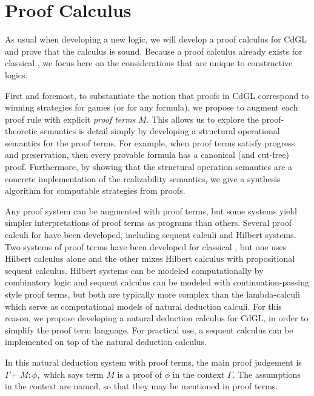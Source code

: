 \documentclass[12pt]{cmuthesis}
\theoremstyle{definition}
\theoremstyle{remark}
\newcommand{\CdGL}{\textsf{CdGL}\xspace}
\begin{document}
\section{Proof Calculus}
\newcommand{\proves}[3]{#1 \vdash #2\mathop{:}#3}
As usual when developing a new logic, we will develop a proof calculus for \CdGL and prove that the calculus is sound.
Because a proof calculus already exists for classical \dGL, we focus here on the considerations that are unique to constructive logics.

First and foremost, to substantiate the notion that proofs in \CdGL correspond to winning strategies for games (or for any formula), we propose to augment each proof rule with explicit \emph{proof terms} $M$.
This allows us to explore the proof-theoretic semantics is detail simply by developing a structural operational semantics for the proof terms.
For example, when proof terms satisfy progress and preservation, then every provable formula has a canonical (and cut-free) proof.
Furthermore, by showing that the structural operation semantics are a concrete implementation of the realizability semantics, we give a synthesis algorithm for computable strategies from proofs.

Any proof system can be augmented with proof terms, but some systems yield simpler interpretations of proof terms as programs than others.
Several proof calculi for \dL have been developed, including sequent calculi and Hilbert systems.
Two systems of proof terms have been developed for classical \dL, but one uses Hilbert calculus alone and the other mixes Hilbert calculus with propositional sequent calculus.
Hilbert systems can be modeled computationally by combinatory logic and sequent calculus can be modeled with continuation-passing style proof terms, but both are typically more complex than the lambda-calculi which serve as computational models of natural deduction calculi.
For this reason, we propose developing a natural deduction calculus for \CdGL, in order to simplify the proof term language.
For practical use, a sequent calculus can be implemented on top of the natural deduction calculus.

In this natural deduction system with proof terms, the main proof judgement is $\proves{\Gamma}{M}{\phi},$ which says term $M$ is a proof of $\phi$ in the context $\Gamma$.
The assumptions in the context are named, so that they may be mentioned in proof terms.
\end{document}
